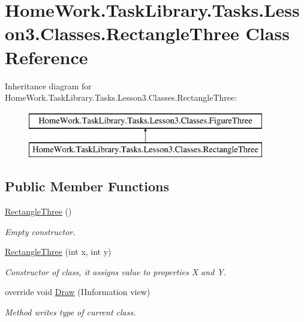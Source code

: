 \hypertarget{class_home_work_1_1_task_library_1_1_tasks_1_1_lesson3_1_1_classes_1_1_rectangle_three}{}\section{Home\+Work.\+Task\+Library.\+Tasks.\+Lesson3.\+Classes.\+Rectangle\+Three Class Reference}
\label{class_home_work_1_1_task_library_1_1_tasks_1_1_lesson3_1_1_classes_1_1_rectangle_three}
Inheritance diagram for Home\+Work.\+Task\+Library.\+Tasks.\+Lesson3.\+Classes.\+Rectangle\+Three\+:\begin{figure}[H]
\begin{center}
\leavevmode
\includegraphics[height=2.000000cm]{class_home_work_1_1_task_library_1_1_tasks_1_1_lesson3_1_1_classes_1_1_rectangle_three}
\end{center}
\end{figure}
\subsection*{Public Member Functions}
\begin{DoxyCompactItemize}
\item 
\mbox{\hyperlink{class_home_work_1_1_task_library_1_1_tasks_1_1_lesson3_1_1_classes_1_1_rectangle_three_ae150719beb52c85a758d918df7f1edab}{Rectangle\+Three}} ()
\begin{DoxyCompactList}\small\item\em Empty constructor. \end{DoxyCompactList}\item 
\mbox{\hyperlink{class_home_work_1_1_task_library_1_1_tasks_1_1_lesson3_1_1_classes_1_1_rectangle_three_aaf448469ac15a6ca048bbd0287cb1de9}{Rectangle\+Three}} (int x, int y)
\begin{DoxyCompactList}\small\item\em Constructor of class, it assigns value to properties X and Y. \end{DoxyCompactList}\item 
override void \mbox{\hyperlink{class_home_work_1_1_task_library_1_1_tasks_1_1_lesson3_1_1_classes_1_1_rectangle_three_a8d5829e8082b1f5e8adbf8ecf91c6f70}{Draw}} (I\+Information view)
\begin{DoxyCompactList}\small\item\em Method writes type of current class. \end{DoxyCompactList}\end{DoxyCompactItemize}
